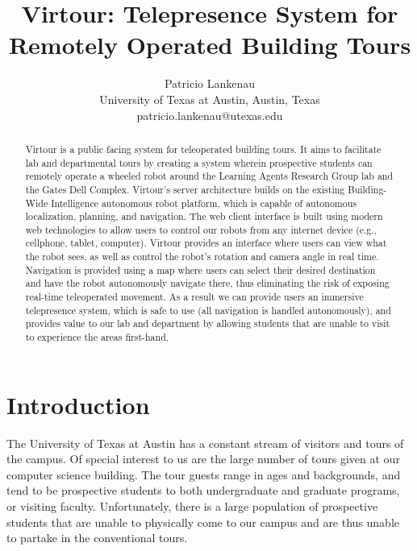 \documentclass[
  oneside,
  11pt, a4paper,
  footinclude=true,
  headinclude=true,
  cleardoublepage=empty
]{article}
\title{Virtour: Telepresence System for Remotely Operated Building Tours}
\author{Patricio Lankenau\\
        University of Texas at Austin, Austin, Texas\\
        patricio.lankenau@utexas.edu\\}
\date{}
\begin{document}
\maketitle

\begin{abstract}
  Virtour is a public facing system for teleoperated building tours. It aims to
  facilitate lab and departmental tours by creating a system wherein
  prospective students can remotely operate a wheeled robot around the Learning
  Agents Research Group lab and the Gates Dell Complex. Virtour's server
  architecture builds on the existing Building-Wide Intelligence autonomous
  robot platform, which is capable of autonomous localization, planning, and
  navigation. The web client interface is built using modern web technologies
  to allow users to control our robots from any internet device (e.g.,
  cellphone, tablet, computer). Virtour provides an interface where users can
  view what the robot sees, as well as control the robot's rotation and camera
  angle in real time. Navigation is provided using a map where users can select
  their desired destination and have the robot autonomously navigate there,
  thus eliminating the risk of exposing real-time teleoperated movement. As a
  result we can provide users an immersive telepresence system, which is safe
  to use (all navigation is handled autonomously), and provides value to our
  lab and department by allowing students that are unable to visit to
  experience the areas first-hand.
\end{abstract}


\section{Introduction}\label{sec:intro}

The University of Texas at Austin has a constant stream of visitors and tours
of the campus. Of special interest to us are the large number of tours given at
our computer science building. The tour guests range in ages and backgrounds,
and tend to be prospective students to both undergraduate and graduate programs,
or visiting faculty. Unfortunately, there is a large population of prospective
students that are unable to physically come to our campus and are thus unable
to partake in the conventional tours.
\end{document}
